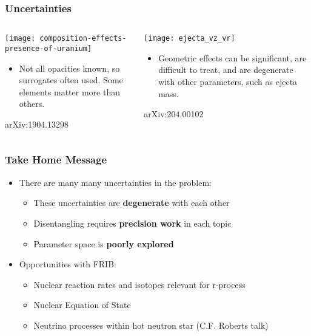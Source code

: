 \documentclass[]{beamer}
\begin{document}
\begin{frame}
  \frametitle{Uncertainties}
  \begin{columns}
    \begin{column}{6cm}
      \begin{center}
        \texttt{[image: composition-effects-presence-of-uranium]}
      \end{center}
      \begin{itemize}
      \item Not all opacities known, so surrogates often used. Some
        elements matter more than others.
      \end{itemize}
      {\footnotesize arXiv:1904.13298}
    \end{column}
    \begin{column}{6cm}
      \begin{center}
        \texttt{[image: ejecta\_vz\_vr]}
      \end{center}
      \begin{itemize}
      \item Geometric effects can be significant, are difficult to
        treat, and are degenerate with other parameters, such as
        ejecta mass.
      \end{itemize}
      {\footnotesize arXiv:204.00102}
    \end{column}
  \end{columns}
\end{frame}

\begin{frame}
  \frametitle{Take Home Message}
  \begin{itemize}
  \item There are many many uncertainties in the problem:
    \begin{itemize}
    \item These uncertainties are \textbf{degenerate} with each other
    \item Disentangling requires \textbf{precision work} in each topic
    \item Parameter space is \textbf{poorly explored}
    \end{itemize}
  \item Opportunities with FRIB:
    \begin{itemize}
    \item Nuclear reaction rates and isotopes relevant for r-process
    \item Nuclear Equation of State
    \item Neutrino processes within hot neutron star (C.F. Roberts talk)
    \end{itemize}
  \end{itemize}
\end{frame}
\end{document}
